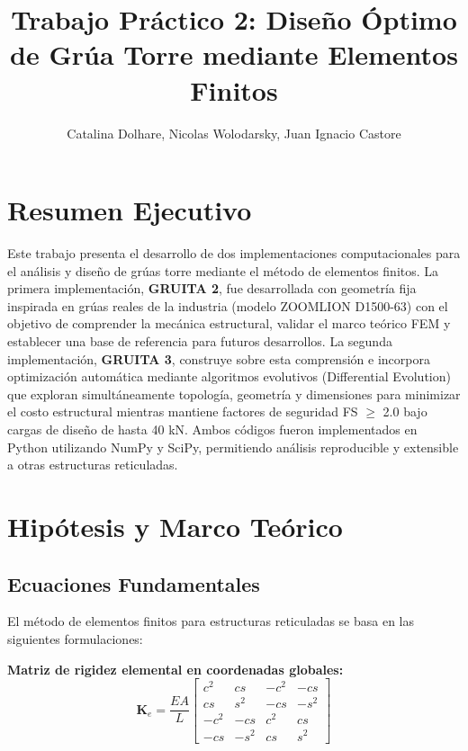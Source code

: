 \documentclass[10pt,a4paper]{article}
\title{\vspace{-1cm}\textbf{Trabajo Práctico 2: Diseño Óptimo de Grúa Torre mediante Elementos Finitos}}
\author{Catalina Dolhare, Nicolas Wolodarsky, Juan Ignacio Castore}
\begin{document}
\maketitle
\vspace{-0.7cm}

\section{Resumen Ejecutivo}

Este trabajo presenta el desarrollo de dos implementaciones computacionales para el análisis y diseño de grúas torre mediante el método de elementos finitos. La primera implementación, \textbf{GRUITA 2}, fue desarrollada con geometría fija inspirada en grúas reales de la industria (modelo ZOOMLION D1500-63) con el objetivo de comprender la mecánica estructural, validar el marco teórico FEM y establecer una base de referencia para futuros desarrollos. La segunda implementación, \textbf{GRUITA 3}, construye sobre esta comprensión e incorpora optimización automática mediante algoritmos evolutivos (Differential Evolution) que exploran simultáneamente topología, geometría y dimensiones para minimizar el costo estructural mientras mantiene factores de seguridad FS $\geq$ 2.0 bajo cargas de diseño de hasta 40 kN. Ambos códigos fueron implementados en Python utilizando NumPy y SciPy, permitiendo análisis reproducible y extensible a otras estructuras reticuladas.

\section{Hipótesis y Marco Teórico}

\subsection{Ecuaciones Fundamentales}

El método de elementos finitos para estructuras reticuladas se basa en las siguientes formulaciones:

\textbf{Matriz de rigidez elemental en coordenadas globales:}
\begin{equation}
\mathbf{K}_e = \frac{EA}{L} \begin{bmatrix}
c^2 & cs & -c^2 & -cs \\
cs & s^2 & -cs & -s^2 \\
-c^2 & -cs & c^2 & cs \\
-cs & -s^2 & cs & s^2
\end{bmatrix}
\end{equation}
\end{document}
